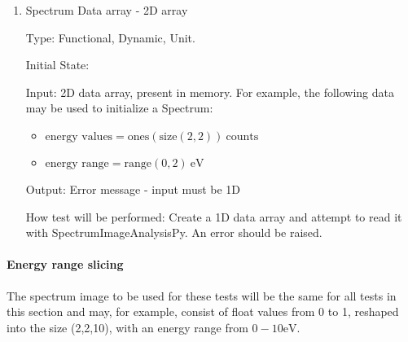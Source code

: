 \documentclass[12pt, titlepage]{article}
\newcommand{\progname}{SpectrumImageAnalysisPy}
\begin{document}
\begin{enumerate}
Initial State: 

Input: 1D data array, present in memory. For example, the following data may be used to initialize a Spectrum:
\begin{itemize}
	\item $\text{energy values} = \text{ones}(\text{size}(10)) + j*\text{ones}(\text{size}(10))\ \text{counts}$
	\item $\text{energy range} = \text{range}(0, 10)\ \si{\electronvolt}$
\end{itemize}

Output: Error message - input must be real

How test will be performed: Create a 1D data array and attempt to read it with \progname{}. An error should be raised.


\item{Spectrum Data array - 2D array}

Type: Functional, Dynamic, Unit.

Initial State: 

Input: 2D data array, present in memory. For example, the following data may be used to initialize a Spectrum:
\begin{itemize}
	\item $\text{energy values} = \text{ones}(\text{size}(2, 2))\ \text{counts}$
	\item $\text{energy range} = \text{range}(0, 2)\ \si{\electronvolt}$
\end{itemize}

Output: Error message - input must be 1D

How test will be performed: Create a 1D data array and attempt to read it with \progname{}. An error should be raised.

\end{enumerate}

\paragraph{Energy range slicing}

The spectrum image to be used for these tests will be the same for all tests in this section and may, for example, consist of float values from 0 to 1, reshaped into the size (2,2,10), with an energy range from $0-10 \si{\electronvolt}$.
\end{document}
